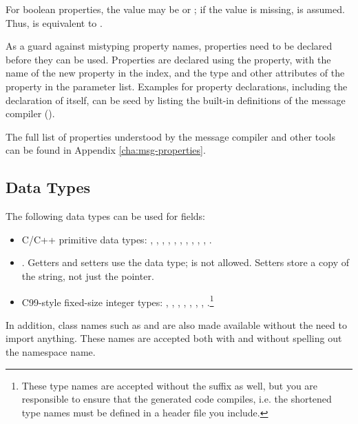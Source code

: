 For boolean properties, the value may be  or ; if
the value is missing,  is assumed. Thus,  is
equivalent to .

As a guard against mistyping property names, properties need to be declared
before they can be used. Properties are declared using the 
property, with the name of the new property in the index, and the type and other
attributes of the property in the parameter list. Examples for property
declarations, including the declaration of  itself, can be seed
by listing the built-in definitions of the message compiler
().

The full list of properties understood by the message compiler and other {\opp}
tools can be found in Appendix \ref{cha:msg-properties}.


\subsection{Data Types}
\label{sec:msg-defs:field-data-types}

The following data types can be used for fields:

\begin{itemize}
  \item C/C++ primitive data types: , ,
    , , , ,
    , , , , .
  \item {}. Getters and setters use the  data
    type;  is not allowed. Setters store a copy of the string, not
    just the pointer.
  \item C99-style fixed-size integer types: ,
    , , ,
    , , ,
    .\footnote{These type names are accepted without the
     suffix as well, but you are responsible to ensure that the
    generated code compiles, i.e. the shortened type names must be defined in a
    header file you include.}
\end{itemize}

In addition, {\opp} class names such as  and  are
also made available without the need to import anything. These names are
accepted both with and without spelling out the  namespace
name.

